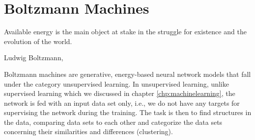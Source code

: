 \chapter{Boltzmann Machines} \label{chp:restricted}
\epigraph{Available energy is the main object at stake in the struggle for existence and the evolution of the world.}{Ludwig Boltzmann, \cite{rajasekar_ludwig_2006}}

Boltzmann machines are generative, energy-based neural network models that fall under the category unsupervised learning. In unsupervised learning, unlike supervised learning which we discussed in chapter \ref{chp:machinelearning}, the network is fed with an input data set only, i.e., we do not have any targets for supervising the network during the training. The task is then to find structures in the data, comparing data sets to each other and categorize the data sets concerning their similarities and differences (clustering).

